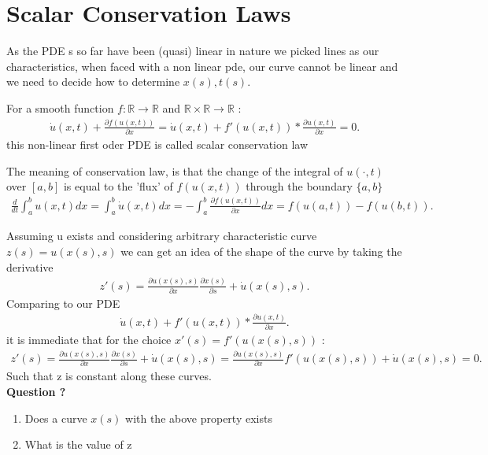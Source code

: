 \section{Scalar Conservation Laws}
As the PDE s so far have been (quasi) linear in nature we picked lines as our characteristics, when faced with a non linear pde, our curve cannot be linear and we need to decide
how to determine $x(s),t(s)$.
\begin{definition}
  For a smooth function $f : \mathbb{R}\to \mathbb{R}$ and $\mathbb{R} \times  \mathbb{R} \to  \mathbb{R}$ :
  \begin{align*}
    \dot{u}(x,t) + \frac{\partial f(u(x,t))}{\partial x} = \dot{u}(x,t) + f'(u(x,t))*\frac{\partial u(x,t)}{\partial x}   = 0
  .\end{align*}
  this non-linear first oder PDE is called scalar conservation law
\end{definition}
\begin{corollary}
  The meaning of conservation law, is that the change of the integral of $u(\cdot,t)$ over $[a,b]$ is  equal to the 'flux' of $f(u(x,t))$ through the boundary $\{a,b\}  $
  \begin{align*}
    \frac{d}{dt} \int_a^b u(x,t) dx = \int_a^b \dot{u}(x,t) dx = - \int_a^b \frac{\partial f(u(x,t))}{\partial x} dx = f(u(a,t)) - f(u(b,t)) 
  .\end{align*}
\end{corollary}
Assuming u exists and considering arbitrary characteristic curve $z(s) = u(x(s),s)$ we can get an idea of the shape of the curve by taking the derivative 
\begin{align*}
  z'(s) = \frac{\partial u(x(s),s)}{\partial x}\frac{\partial x(s)}{\partial s} + \dot{u}(x(s),s)  
.\end{align*}
Comparing to our PDE 
\begin{align*}
  \dot{u}(x,t) + f'(u(x,t))*\frac{\partial u(x,t)}{\partial x}  
.\end{align*}
it is immediate that for the choice $x'(s) = f'(u(x(s),s))$  :
\begin{align*}
  z'(s) = \frac{\partial u(x(s),s)}{\partial x}\frac{\partial x(s)}{\partial s} + \dot{u}(x(s),s)  = \frac{\partial u(x(s),s)}{\partial x}f'(u(x(s),s)) + \dot{u}(x(s),s)=0
.\end{align*}
Such that z is constant along these curves. \\[1ex]
\textbf{Question ?}
\begin{enumerate}
  \item  Does a curve $x(s)$ with the above property exists 
  \item What is the value of z
\end{enumerate}
